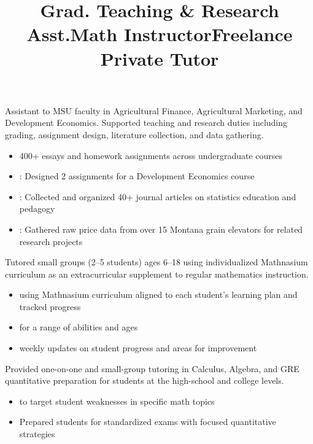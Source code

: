 \documentclass[resmargin, centered, 10pt]{../res}
\begin{document}
\begin{resume}
\title{Grad. Teaching \& Research Asst.}
\begin{position}
Assistant to MSU faculty in Agricultural Finance, Agricultural Marketing, and Development Economics. Supported teaching and research duties including grading, assignment design, literature collection, and data gathering.

\begin{itemize}
    \item {} 400+ essays and homework assignments across undergraduate courses
    \item {}: Designed 2 assignments for a Development Economics course
    \item {}: Collected and organized 40+ journal articles on statistics education and pedagogy
    \item {}: Gathered raw price data from over 15 Montana grain elevators for related research projects
\end{itemize}
\end{position}

\title{Math Instructor}
\begin{position}
Tutored small groups (2--5 students) ages 6--18 using individualized Mathnasium curriculum as an extracurricular supplement to regular mathematics instruction.
\begin{itemize}
	\item {} using Mathnasium curriculum aligned to each student’s learning plan and tracked progress
	\item {} for a range of abilities and ages
	\item {} weekly updates on student progress and areas for improvement
\end{itemize}
\end{position}

\title{Freelance Private Tutor}
\begin{position}
	Provided one-on-one and small-group tutoring in Calculus, Algebra, and GRE quantitative preparation for students at the high-school and college levels.
	\begin{itemize}
		\item {} to target student weaknesses in specific math topics
		\item {}Prepared students for standardized exams with focused quantitative strategies
	\end{itemize}
\end{position}


\end{resume}
\end{document}
